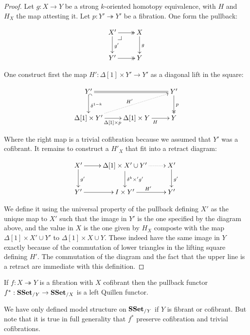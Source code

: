 \documentclass[reqno,10pt,a4paper,oneside,draft]{amsart}
\begin{document}
\begin{proof}

Let $g :X \rightarrow Y$ be a strong $k$-oriented homotopy equivalence, with $H$ and $H_X$ the map attesting it. Let $p: Y' \twoheadrightarrow Y'$ be a fibration. One form the pullback:

\[\xymatrix{
X' \ar@{->>}[r] \drpullback \ar[d]^{g'} & X \ar[d]^{g} \\
Y' \ar@{->>}[r] & Y\\
}\]

One construct first the map $H': \Delta[1] \times Y' \rightarrow Y'$ as a diagonal lift in the square:


\[\xymatrix{
Y' \ar@{^{(}->}[d]^{\delta^{1-k}} \ar@{=}[rr] & & Y' \ar@{->>}[d]^p \\ 
\Delta[1] \times Y' \ar[r]_{\Delta[1] \times p} \ar@{.>}[urr]^{H'} & \Delta[1] \times Y \ar[r]_H & Y
}\]

Where the right map is a trivial cofibration because we assumed that $Y'$ was a cofibrant.
It remains to construct a $H'_X$ that fit into a retract diagram:


\[\xymatrix{X' \ar[d]^{g'} \ar[r] & \Delta[1] \times X' \cup Y' \ar[d]^{\delta^k \times' g'} \ar@{.>}[r] & X' \ar[d]^{g'} \\
Y' \ar[r] & I \times Y' \ar[r]^{H'} & Y' 
}\]

We define it using the universal property of the pullback defining $X'$ as the unique map to $X'$ such that the image in $Y'$ is the one specified by the diagram above, and the value in $X$ is the one given by $H_X$ composte with the map $ \Delta[1] \times X' \cup Y'$ to $ \Delta[1] \times X \cup Y$. These indeed have the same image in $Y$ exactly because of the commutation of lower triangles in the lifting square defining $H'$. The commutation of the diagram and the fact that the upper line is a retract are immediate with this definition.
\end{proof}



\begin{proposition}\label{prop:Frobenius}
If $f:X \twoheadrightarrow Y$ is a fibration with $X$ cofibrant then the pullback functor $f^* : \mathbf{SSet}_{/Y} \rightarrow \mathbf{SSet}_{/X}$ is a left Quillen functor.
\end{proposition}

We have only defined model structure on $\mathbf{SSet}_{/Y}$ if $Y$ is fibrant or cofibrant. But note that it is true in full generality that $f^*$ preserve cofibration and trivial cofibrations.
\end{document}
